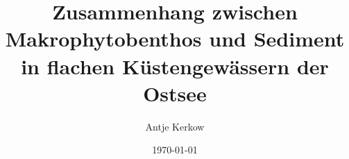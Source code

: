 



\pagestyle{empty}



\titlehead{Ernst Moritz Arndt Universität Greifswald\\
           Fachbereich Naturwissenschaften\\
           Institut für Landschaftsökologie und Naturschutz}

\subject{Diplomarbeit}

\title{Zusammenhang zwischen Makrophytobenthos und Sediment in flachen Küstengewässern der Ostsee}


\author{Antje Kerkow}

\date{\today} 

\publishers{Dozenten:\\PD Dr. Irmgard Blindow \\Prof. Dr. Hendrik Schubert}





\maketitle %
\clearpage


\pagestyle{scrheadings}    %
\clearscrheadfoot

\cfoot{\pagemark}
\chead{\headmark}


\tableofcontents

\newpage

\listoffigures

\listoftables

